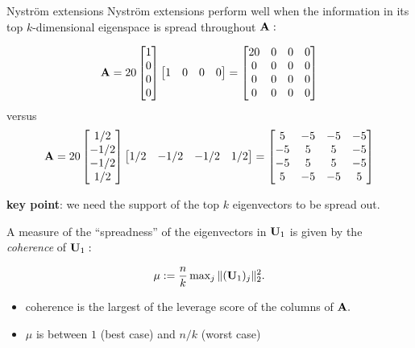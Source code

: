 \documentclass[xcolor=x11names,compress,ignorenonframetext]{beamer}
\renewcommand{\(}{\begin{columns}}
\renewcommand{\)}{\end{columns}}
\newcommand{\<}[1]{\begin{column}{#1}}
\renewcommand{\>}{\end{column}}
\begin{document}
 
\begin{frame}{Nystr\"om extensions}
Nystr\"om extensions perform well when 
the information in its top $k$-dimensional eigenspace is spread throughout $\mathbf{A}:$

\[
 \mathbf{A} = 20 \left[\begin{matrix} 1 \\ 0 \\ 0 \\ 0 \end{matrix}\right]
              \left[\begin{matrix} 1 & 0 & 0 & 0 \end{matrix}\right] = \left[\begin{matrix}
  20 & 0 & 0 & 0 \\
  0    & 0 & 0 & 0 \\
  0    & 0 & 0 & 0 \\
  0    & 0 & 0 & 0
 \end{matrix}
 \right]
\]
versus
\[
\mathbf{A} = 20 \left[\begin{matrix} 1/2 \\ -1/2 \\ -1/2 \\ 1/2 \end{matrix}\right]
              \left[\begin{matrix} 1/2 & -1/2 & -1/2 & 1/2 \end{matrix}\right] =              
  \left[\begin{matrix}
                 5 & -5 & -5 & -5 \\
                 -5 & 5 & 5 & -5 \\
                 -5 & 5 & 5 & -5 \\
                  5 & -5 & -5 & 5
                \end{matrix}
  \right]
 \]
 
 \textbf{key point}: we need the support of the top $k$ eigenvectors to be spread out.
 \end{frame}
 
 \begin{frame}

 A measure of the 
 ``spreadness'' of the eigenvectors in $\mathbf{U}_1$ is given by the \emph{coherence} of $\mathbf{U}_1:$
 
 \[
  \mu := \frac{n}{k} \max\nolimits_j \|(\mathbf{U}_1)_j\|_2^2.
 \]
 
 \begin{itemize}
  \item coherence is the largest of the leverage score of the columns of $\mathbf{A}.$
  \item $\mu$ is between $1$ (best case) and $n/k$ (worst case)
 \end{itemize}

 \end{frame}
 
\end{document}
